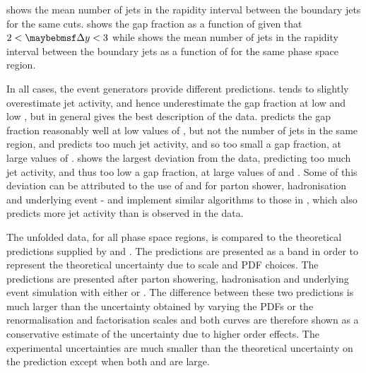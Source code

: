  shows the mean number of jets in the rapidity interval between the boundary jets for
the same cuts.  shows the gap fraction as a
function of \pTbar given that $2 < \DeltaY < 3$ while  shows
the mean number of jets in the rapidity interval between the boundary jets as a function
of \pTbar for the same phase space region.

In all cases, the \MC event generators provide different predictions.
\Pythia tends to slightly overestimate jet activity, and hence underestimate the
gap fraction at low \DeltaY and low \pTbar, but in general gives the best
description of the data. \Herwigpp predicts the gap fraction reasonably well at
low values of \DeltaY, but not the number of jets in the same region, and predicts
too much jet activity, and so too small a gap fraction, at large values of \DeltaY.
\Alpgen shows the largest deviation from the data, predicting too much jet activity, and
thus too low a gap fraction, at large values of \DeltaY and \pTbar. Some of this deviation
can be attributed to the use of \Herwig and \Jimmy for parton shower, hadronisation
and underlying event - \Herwig and \Jimmy implement similar algorithms to those in
\Herwigpp, which also predicts more jet activity than is observed in the data.

The unfolded data, for all phase space regions, is compared to the theoretical
predictions supplied by \Powheg and \HEJ. The \HEJ predictions are presented as a band
in order to represent the theoretical uncertainty due to scale and PDF choices. The \Powheg predictions are presented
after parton showering, hadronisation and underlying event simulation with either \Pythia or \Herwig.
The difference between these two predictions is much larger than the uncertainty
obtained by varying the PDFs or the renormalisation and factorisation scales and
both curves are therefore shown as a conservative estimate of the uncertainty
due to higher order effects. The experimental uncertainties
are much smaller than the theoretical uncertainty on the \HEJ prediction except when
both \DeltaY and \pTbar are large. 


